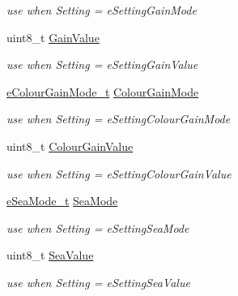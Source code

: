 \begin{DoxyCompactItemize}
\begin{DoxyCompactList}\small\item\em use when \textquotesingle{}Setting\textquotesingle{} = e\+Setting\+Gain\+Mode \end{DoxyCompactList}\item 
uint8\+\_\+t \mbox{\hyperlink{union_quantum_lib_1_1_setting_data__t_1_1_value__t_a2cefb0ffca860eaff10d26c88b743e9a}{Gain\+Value}}
\begin{DoxyCompactList}\small\item\em use when \textquotesingle{}Setting\textquotesingle{} = e\+Setting\+Gain\+Value \end{DoxyCompactList}\item 
\mbox{\hyperlink{namespace_quantum_lib_a4e404872667f9386ba59973f4b29fe65}{e\+Colour\+Gain\+Mode\+\_\+t}} \mbox{\hyperlink{union_quantum_lib_1_1_setting_data__t_1_1_value__t_a6e62c855ab85db332bbc829a8bd7524d}{Colour\+Gain\+Mode}}
\begin{DoxyCompactList}\small\item\em use when \textquotesingle{}Setting\textquotesingle{} = e\+Setting\+Colour\+Gain\+Mode \end{DoxyCompactList}\item 
uint8\+\_\+t \mbox{\hyperlink{union_quantum_lib_1_1_setting_data__t_1_1_value__t_ae374255f313816ce826bc1b13fb6a669}{Colour\+Gain\+Value}}
\begin{DoxyCompactList}\small\item\em use when \textquotesingle{}Setting\textquotesingle{} = e\+Setting\+Colour\+Gain\+Value \end{DoxyCompactList}\item 
\mbox{\hyperlink{namespace_quantum_lib_a66c359df4d1d3895303ab24910200c8d}{e\+Sea\+Mode\+\_\+t}} \mbox{\hyperlink{union_quantum_lib_1_1_setting_data__t_1_1_value__t_ad833d8be99c8d3b118cd9f862c2eaf80}{Sea\+Mode}}
\begin{DoxyCompactList}\small\item\em use when \textquotesingle{}Setting\textquotesingle{} = e\+Setting\+Sea\+Mode \end{DoxyCompactList}\item 
uint8\+\_\+t \mbox{\hyperlink{union_quantum_lib_1_1_setting_data__t_1_1_value__t_aa461dc5822e60e62474235f6c685fe3c}{Sea\+Value}}
\begin{DoxyCompactList}\small\item\em use when \textquotesingle{}Setting\textquotesingle{} = e\+Setting\+Sea\+Value \end{DoxyCompactList}\item 

\end{DoxyCompactItemize}
